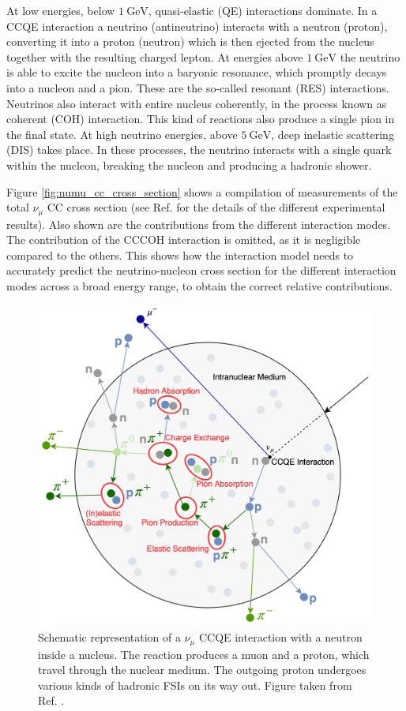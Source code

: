 At low energies, below $1~\mathrm{GeV}$, quasi-elastic (QE) interactions dominate. In a CCQE interaction a neutrino (antineutrino) interacts with a neutron (proton), converting it into a proton (neutron) which is then ejected from the nucleus together with the resulting charged lepton. At energies above $1~\mathrm{GeV}$ the neutrino is able to excite the nucleon into a baryonic resonance, which promptly decays into a nucleon and a pion. These are the so-called resonant (RES) interactions. Neutrinos also interact with entire nucleus coherently, in the process known as coherent (COH) interaction. This kind of reactions also produce a single pion in the final state. At high neutrino energies, above $5~\mathrm{GeV}$, deep inelastic scattering (DIS) takes place. In these processes, the neutrino interacts with a single quark within the nucleon, breaking the nucleon and producing a hadronic shower.

Figure \ref{fig:numu_cc_cross_section} shows a compilation of measurements of the total $\nu_{\mu}$ CC cross section (see Ref. \cite{Formaggio2012} for the details of the different experimental results). Also shown are the contributions from the different interaction modes. The contribution of the CCCOH interaction is omitted, as it is negligible compared to the others. This shows how the interaction model needs to accurately predict the neutrino-nucleon cross section for the different interaction modes across a broad energy range, to obtain the correct relative contributions.

\begin{figure}[t]
	\centering
	\includegraphics[width=.55\linewidth]{Images/Nu/lars_fsi.png}
	\caption[Schematic representation of a $\nu_{\mu}$ CCQE interaction with a neutron inside a nucleus.]{Schematic representation of a $\nu_{\mu}$ CCQE interaction with a neutron inside a nucleus. The reaction produces a muon and a proton, which travel through the nuclear medium. The outgoing proton undergoes various kinds of hadronic FSIs on its way out. Figure taken from Ref. \cite{Bathe-Peters2022}.}
	\label{fig:fsi_diagram}
\end{figure}

